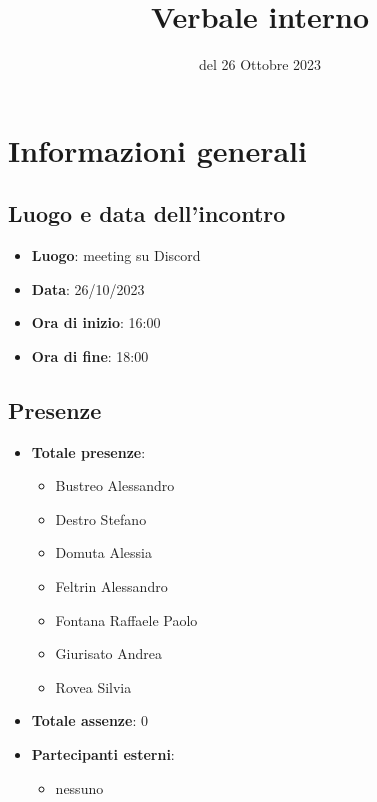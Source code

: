 \documentclass[12pt]{article}
\title{Verbale interno}
\date{del 26 Ottobre 2023}
\begin{document}
	\makefirstpage
	
	
	\clearpage
	
	\tableofcontents
	\clearpage

    \section{Informazioni generali}
    
    \subsection{Luogo e data dell'incontro}
    
    \begin{itemize}
    	\item \textbf{Luogo}: meeting su Discord
    	\item \textbf{Data}: 26/10/2023
    	\item \textbf{Ora di inizio}: 16:00
    	\item \textbf{Ora di fine}: 18:00
    \end{itemize}
    
    \subsection{Presenze}
    
    \begin{itemize}
    	\item \textbf{Totale presenze}:
    	\begin{itemize}
    		\item Bustreo Alessandro
    		\item Destro Stefano
    		\item Domuta Alessia 
    		\item Feltrin Alessandro 
    		\item Fontana Raffaele Paolo 
    		\item Giurisato Andrea 
    		\item Rovea Silvia
    	\end{itemize}
    	
    	\item \textbf{Totale assenze}: 0
    	
    	\item \textbf{Partecipanti esterni}:
    	\begin{itemize}
    		\item nessuno
    	\end{itemize}
    \end{itemize}
    
\end{document}
